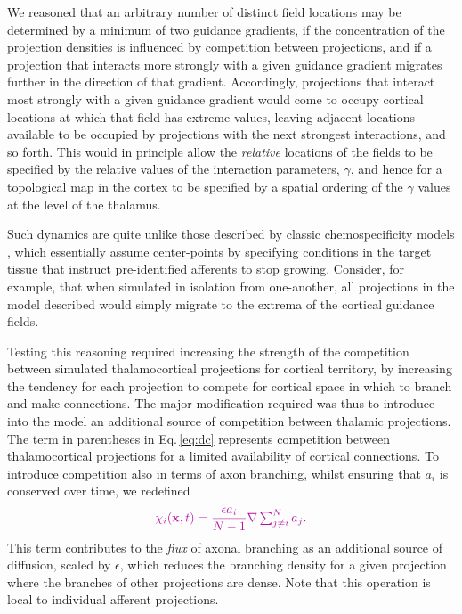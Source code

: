 \documentclass[9pt,lineno]{elife}
\newcommand{\cmnt}[1]{\textcolor{colcmnt}{#1}}
\newcommand{\mb}[1]{\mathbf{#1}}
\begin{document}
\cmnt{We reasoned that an arbitrary number of distinct field locations may
  be determined by a minimum of two guidance gradients, if the concentration
  of the projection densities is influenced by competition between
  projections, and if a projection that interacts more strongly with a given
  guidance gradient migrates further in the direction of that gradient.
  Accordingly, projections that interact most strongly with a given
  guidance gradient would come to occupy cortical locations at which that
  field has extreme values, leaving adjacent locations available to be
  occupied by projections with the next strongest interactions, and so
  forth. This would in principle allow the \emph{relative} locations of the
  fields to be specified by the relative values of the interaction parameters,
  $\gamma$, and hence for a topological map in the cortex to be specified by a
  spatial ordering of the $\gamma$ values at the level of the thalamus.}

\cmnt{Such dynamics are quite unlike those described by classic
  chemospecificity models} \citep{sperry_chemoaffinity_1963}, \cmnt{which
  essentially assume center-points by specifying conditions in the target
  tissue that instruct pre-identified afferents to stop growing. Consider, for
  example, that when simulated in isolation from one-another, all projections
  in the model described would simply migrate to the extrema of the cortical
  guidance fields.}

\cmnt{Testing this reasoning required increasing the strength of the
  competition between simulated thalamocortical projections for cortical
  territory, by increasing the tendency for each projection to compete for
  cortical space in which to branch and make connections. The major
  modification required
  was thus to introduce into the model an additional source of competition
  between thalamic projections.}
%
The term in parentheses in Eq.\,\ref{eq:dc} represents competition between
thalamocortical projections for a limited availability of cortical
connections. To introduce competition also in terms of axon branching,
\cmnt{whilst ensuring that $a_i$ is conserved over time,} we
redefined
%
\begin{equation} \label{eq:comp}
  \color{colcmnt}
  \chi_i(\mb{x}, t) = \frac{\epsilon a_i}{N-1} \nabla \textstyle\sum_{j\ne i}^{N}{a_j}.
  \color{black}
\end{equation}
%
\cmnt{This term contributes to the \emph{flux} of axonal branching as an
  additional source of diffusion, scaled by $\epsilon$, which reduces the
  branching density for a given projection where the branches of other
  projections are dense. Note that this operation is local to individual
  afferent projections.}
\end{document}
